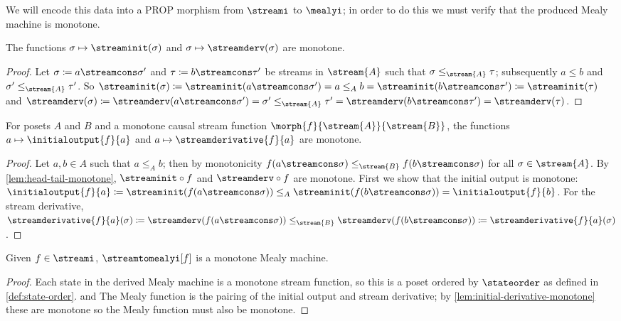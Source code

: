 \documentclass{lmcs}
\begin{document}
We will encode this data into a PROP morphism from \(\streami\) to \(\mealyi\);
in order to do this we must verify that the produced Mealy machine is monotone.

\begin{lem}\label{lem:head-tail-monotone}
    The functions \(\sigma \mapsto \streaminit(\sigma)\) and
    \(\sigma \mapsto \streamderv(\sigma)\) are monotone.
\end{lem}
\begin{proof}
    Let \(\sigma \coloneqq a \streamcons \sigma^\prime\) and
    \(\tau \coloneqq b \streamcons \tau^\prime\) be streams in \(\stream{A}\)
    such that \(\sigma \leq_{\stream{A}} \tau\); subsequently \(a \leq b\) and
    \(\sigma^\prime \leq_{\stream{A}} \tau^\prime\).
    So \(
    \streaminit(\sigma) \coloneqq
    \streaminit(a \streamcons \sigma^\prime) =
    a \leq_{A}
    b =
    \streaminit(b \streamcons \tau^\prime) \coloneqq
    \streaminit(\tau)
    \) and \(
    \streamderv(\sigma) \coloneqq
    \streamderv(a \streamcons \sigma^\prime) =
    \sigma^\prime \leq_{\stream{A}}
    \tau^\prime =
    \streamderv(b \streamcons \tau^\prime) =
    \streamderv(\tau)
    \).
\end{proof}

\begin{lem}\label{lem:initial-derivative-monotone}
    For posets \(A\) and \(B\) and a monotone causal stream function
    \(\morph{f}{\stream{A}}{\stream{B}}\), the functions
    \(a \mapsto \initialoutput{f}{a}\) and \(a \mapsto \streamderivative{f}{a}\)
    are monotone.
\end{lem}
\begin{proof}
    Let \(a, b \in A\) such that \(a \leq_A b\); then by monotonicity
    \(f(a \streamcons \sigma) \leq_{\stream{B}} f(b \streamcons \sigma)\) for
    all \(\sigma \in \stream{A}\).
    By \autoref{lem:head-tail-monotone}, \(\streaminit \circ f\) and
    \(\streamderv \circ f\) are monotone.
    First we show that the initial output is monotone: \(
    \initialoutput{f}{a} \coloneqq
    \streaminit(f(a \streamcons \sigma)) \leq_{A}
    \streaminit(f(b \streamcons \sigma)) =
    \initialoutput{f}{b}
    \).
    For the stream derivative, \(
    \streamderivative{f}{a}(\sigma) \coloneqq
    \streamderv(f(a \streamcons \sigma)) \leq_{\stream{B}}
    \streamderv(f(b \streamcons \sigma)) \coloneqq
    \streamderivative{f}{a}(\sigma)
    \).
\end{proof}

\begin{lem}\label{lem:stream-to-mealy-is-monotone}
    Given \(f \in \streami\), \(\streamtomealyi[f]\) is
    a monotone Mealy machine.
\end{lem}
\begin{proof}
    Each state in the derived Mealy machine is a monotone stream function, so
    this is a poset ordered by \(\stateorder\) as defined in
    \autoref{def:state-order}. and
    The Mealy function is the pairing of the initial output and stream
    derivative; by \autoref{lem:initial-derivative-monotone} these are monotone so
    the Mealy function must also be monotone.
\end{proof}
\end{document}
